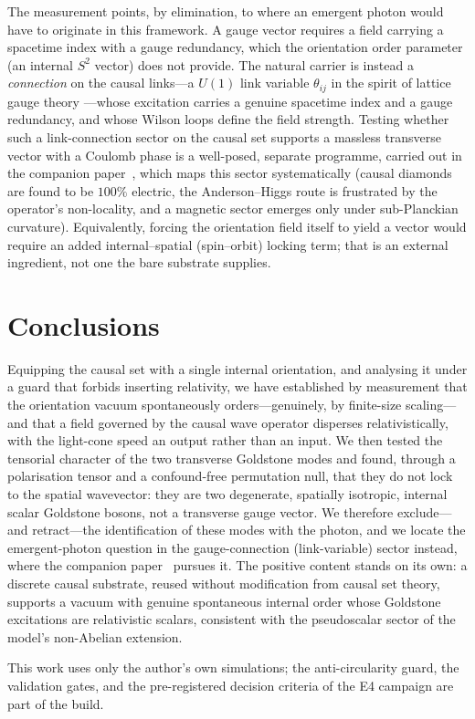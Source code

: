 \documentclass[aps,prd,reprint,nofootinbib,superscriptaddress,floatfix]{revtex4-2}
\begin{document}
The measurement points, by elimination, to where an emergent photon would have to
originate in this framework. A gauge vector requires a field carrying a spacetime
index with a gauge redundancy, which the orientation order parameter (an internal
$S^2$ vector) does not provide. The natural carrier is instead a \emph{connection}
on the causal links---a $U(1)$ link variable $\theta_{ij}$ in the spirit of lattice
gauge theory \cite{Wilson1974}---whose excitation carries a genuine spacetime index
and a gauge redundancy, and whose Wilson loops define the field strength. Testing
whether such a link-connection sector on the causal set supports a massless
transverse vector with a Coulomb phase is a well-posed, separate programme, carried
out in the companion paper~\cite{PhotonArcCQG}, which maps this sector systematically
(causal diamonds are found to be $100\%$ electric, the Anderson--Higgs route is
frustrated by the operator's non-locality, and a magnetic sector emerges only under
sub-Planckian curvature). Equivalently, forcing the orientation field itself to
yield a vector would require an added internal--spatial (spin--orbit) locking term;
that is an external ingredient, not one the bare substrate supplies.

\section{Conclusions}\label{sec:conclusions}

Equipping the causal set with a single internal orientation, and analysing it under
a guard that forbids inserting relativity, we have established by measurement that
the orientation vacuum spontaneously orders---genuinely, by finite-size
scaling---and that a field governed by the causal wave operator disperses
relativistically, with the light-cone speed an output rather than an input. We then
tested the tensorial character of the two transverse Goldstone modes and found,
through a polarisation tensor and a confound-free permutation null, that they do not
lock to the spatial wavevector: they are two degenerate, spatially isotropic,
internal scalar Goldstone bosons, not a transverse gauge vector. We therefore
exclude---and retract---the identification of these modes with the photon, and we
locate the emergent-photon question in the gauge-connection (link-variable) sector
instead, where the companion paper~\cite{PhotonArcCQG} pursues it. The positive content stands on its own: a discrete causal substrate,
reused without modification from causal set theory, supports a vacuum with genuine
spontaneous internal order whose Goldstone excitations are relativistic scalars,
consistent with the pseudoscalar sector of the model's non-Abelian extension.

\begin{acknowledgments}
This work uses only the author's own simulations; the anti-circularity guard, the
validation gates, and the pre-registered decision criteria of the E4 campaign are
part of the build.
\end{acknowledgments}



\end{document}
